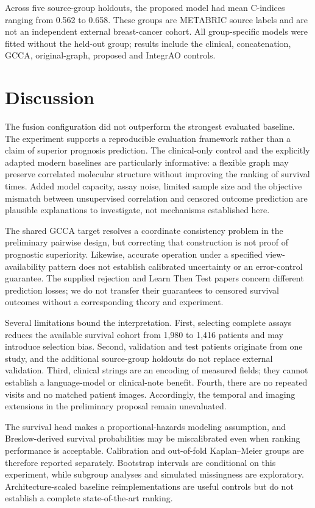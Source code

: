 \documentclass{article}
\begin{document}
Across five source-group holdouts, the proposed model had mean C-indices ranging from 0.562 to 0.658. These groups are METABRIC source labels and are
not an independent external breast-cancer cohort. All group-specific models
were fitted without the held-out group; results include the clinical,
concatenation, GCCA, original-graph, proposed and IntegrAO controls.
\clearpage
\section{Discussion}
The fusion configuration did not outperform the strongest evaluated baseline. The experiment supports a reproducible evaluation framework rather than a claim of superior prognosis prediction. The clinical-only control and the explicitly adapted
modern baselines are particularly informative: a flexible graph may preserve
correlated molecular structure without improving the ranking of survival
times. Added model capacity, assay noise, limited sample size and the objective
mismatch between unsupervised correlation and censored outcome prediction
are plausible explanations to investigate, not mechanisms established here.

The shared GCCA target resolves a coordinate consistency problem in the
preliminary pairwise design, but correcting that construction is not proof
of prognostic superiority. Likewise, accurate operation under a specified
view-availability pattern does not establish calibrated uncertainty or an
error-control guarantee. The supplied rejection and Learn Then Test papers
concern different prediction losses; we do not transfer their guarantees to
censored survival outcomes without a corresponding theory and experiment.

Several limitations bound the interpretation. First, selecting complete assays
reduces the available survival cohort from 1,980 to 1,416 patients and may
introduce selection bias. Second, validation and test patients originate from
one study, and the additional source-group holdouts do not replace external
validation. Third, clinical strings are an encoding of measured fields; they
cannot establish a language-model or clinical-note benefit. Fourth, there are
no repeated visits and no matched patient images. Accordingly, the temporal
and imaging extensions in the preliminary proposal remain unevaluated.

The survival head makes a proportional-hazards modeling assumption, and
Breslow-derived survival probabilities may be miscalibrated even when ranking
performance is acceptable. Calibration and out-of-fold Kaplan--Meier groups
are therefore reported separately. Bootstrap intervals are conditional on
this experiment, while subgroup analyses and simulated missingness are
exploratory. Architecture-scaled baseline reimplementations are useful
controls but do not establish a complete state-of-the-art ranking.
\end{document}
